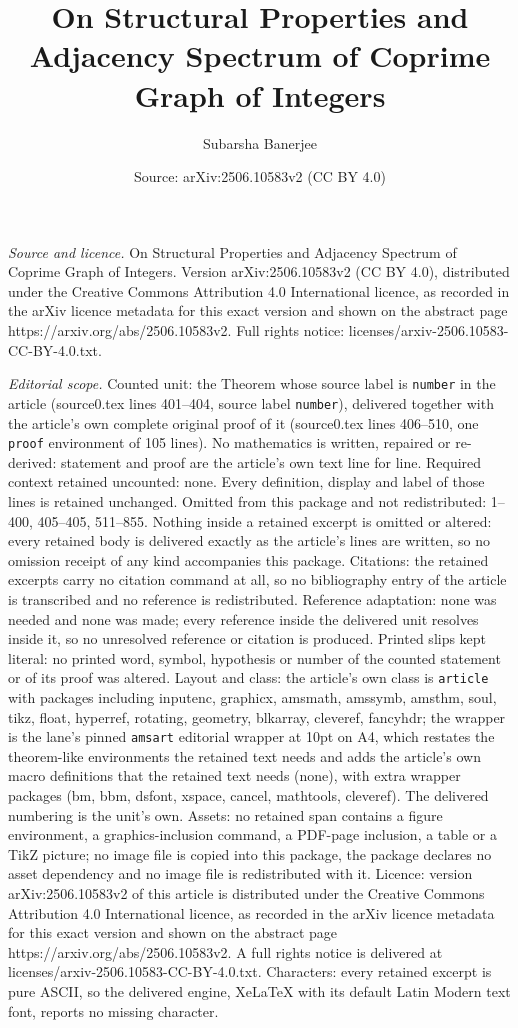 \documentclass[10pt,a4paper]{amsart}
\title[On Structural Properties and Adjacency Spectrum of Coprime G]{On Structural Properties and Adjacency Spectrum of Coprime Graph of Integers}
\author{Subarsha Banerjee}
\date{Source: arXiv:2506.10583v2 (CC BY 4.0)}
\begin{document}
\maketitle

\noindent\emph{Source and licence.} On Structural Properties and Adjacency Spectrum of Coprime Graph of Integers. Version arXiv:2506.10583v2 (CC BY 4.0), distributed under the Creative Commons Attribution 4.0 International licence, as recorded in the arXiv licence metadata for this exact version and shown on the abstract page https://arxiv.org/abs/2506.10583v2. Full rights notice: licenses/arxiv-2506.10583-CC-BY-4.0.txt.\par\smallskip

\noindent\textit{Editorial scope.} Counted unit: the Theorem whose source label is \texttt{number} in the article (source0.tex lines 401--404, source label \texttt{number}), delivered together with the article's own complete original proof of it (source0.tex lines 406--510, one \texttt{proof} environment of 105 lines). No mathematics is written, repaired or re-derived: statement and proof are the article's own text line for line. Required context retained uncounted: none. Every definition, display and label of those lines is retained unchanged. Omitted from this package and not redistributed: 1--400, 405--405, 511--855. Nothing inside a retained excerpt is omitted or altered: every retained body is delivered exactly as the article's lines are written, so no omission receipt of any kind accompanies this package. Citations: the retained excerpts carry no citation command at all, so no bibliography entry of the article is transcribed and no reference is redistributed. Reference adaptation: none was needed and none was made; every reference inside the delivered unit resolves inside it, so no unresolved reference or citation is produced. Printed slips kept literal: no printed word, symbol, hypothesis or number of the counted statement or of its proof was altered. Layout and class: the article's own class is \texttt{article} with packages including inputenc, graphicx, amsmath, amssymb, amsthm, soul, tikz, float, hyperref, rotating, geometry, blkarray, cleveref, fancyhdr; the wrapper is the lane's pinned \texttt{amsart} editorial wrapper at 10pt on A4, which restates the theorem-like environments the retained text needs and adds the article's own macro definitions that the retained text needs (none), with extra wrapper packages (bm, bbm, dsfont, xspace, cancel, mathtools, cleveref). The delivered numbering is the unit's own. Assets: no retained span contains a figure environment, a graphics-inclusion command, a PDF-page inclusion, a table or a TikZ picture; no image file is copied into this package, the package declares no asset dependency and no image file is redistributed with it. Licence: version arXiv:2506.10583v2 of this article is distributed under the Creative Commons Attribution 4.0 International licence, as recorded in the arXiv licence metadata for this exact version and shown on the abstract page https://arxiv.org/abs/2506.10583v2. A full rights notice is delivered at licenses/arxiv-2506.10583-CC-BY-4.0.txt. Characters: every retained excerpt is pure ASCII, so the delivered engine, XeLaTeX with its default Latin Modern text font, reports no missing character.
\end{document}
